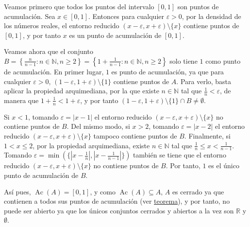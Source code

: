 \documentclass[
  spanish,
  a4paper,
]{scrreport}
\theoremstyle{definition}
\theoremstyle{remark}
\begin{document}
\begin{tcolorbox}[enhanced jigsaw, arc=.35mm, bottomrule=.15mm, bottomtitle=1mm, breakable, colback=white, colbacktitle=quarto-callout-tip-color!10!white, colframe=quarto-callout-tip-color-frame, coltitle=black, left=2mm, leftrule=.75mm, opacityback=0, opacitybacktitle=0.6, rightrule=.15mm, title=\textcolor{quarto-callout-tip-color}{\faLightbulb}\hspace{0.5em}{Solución}, titlerule=0mm, toprule=.15mm, toptitle=1mm]

Veamos primero que todos los puntos del intervalo \([0,1]\) son puntos
de acumulación. Sea \(x\in[0,1]\). Entonces para cualquier
\(\varepsilon>0\), por la densidad de los números reales, el entorno
reducido \((x-\varepsilon,x+\varepsilon)\setminus\{x\}\) contiene puntos
de \([0,1]\), y por tanto \(x\) es un punto de acumulación de \([0,1]\).

Veamos ahora que el conjunto
\(B=\left\{\frac{n}{n-1}: n\in\mathbb{N}, n\geq 2\right\} = \left\{1+\frac{1}{n-1}: n\in\mathbb{N}, n\geq 2\right\}\)
solo tiene \(1\) como punto de acumulación. En primer lugar, \(1\) es
punto de acumulación, ya que para cualquier \(\varepsilon>0\),
\((1-\varepsilon, 1+\varepsilon)\setminus  \{1\}\) contiene puntos de
\(A\). Para verlo, basta aplicar la propiedad arquimediana, por la que
existe \(n\in\mathbb{N}\) tal que \(\frac{1}{n}<\varepsilon\), de manera
que \(1+\frac{1}{n}<1+\varepsilon\), y por tanto
\((1-\varepsilon, 1+\varepsilon)\setminus  \{1\}\cap B\neq \emptyset\).

Si \(x<1\), tomando \(\varepsilon=|x-1|\) el entorno reducido
\((x-\varepsilon, x+\varepsilon)\setminus\{x\}\) no contiene puntos de
\(B\). Del mismo modo, si \(x>2\), tomando \(\varepsilon=|x-2|\) el
entorno reducido \((x-\varepsilon, x+\varepsilon)\setminus\{x\}\)
tampoco contiene puntos de \(B\). Finalmente, si \(1<x\leq 2\), por la
propiedad arquimediana, existe \(n\in\mathbb{N}\) tal que
\(\frac{1}{n}\leq x<\frac{1}{n-1}\). Tomando
\(\varepsilon=\min(\{|x-\frac{1}{n}|,|x-\frac{1}{n-1}|\})\) también se
tiene que el entorno reducido
\((x-\varepsilon, x+\varepsilon)\setminus\{x\}\) no contiene puntos de
\(B\). Por tanto, \(1\) es el único punto de acumulación de \(B\).

Así pues, \(\operatorname{Ac}(A)=[0,1]\), y como
\(\operatorname{Ac}(A)\subseteq A\), \(A\) es cerrado ya que contienen a
todos sus puntos de acumulación (ver
\href{https://aprendeconalf.es/analisis-manual/topologia-reales.html\#thm-conjunto-cerrado-puntos-acumulacion}{teorema}),
y por tanto, no puede ser abierto ya que los únicos conjuntos cerrados y
abiertos a la vez son \(\mathbb{R}\) y \(\emptyset\).

\end{tcolorbox}
\end{document}
